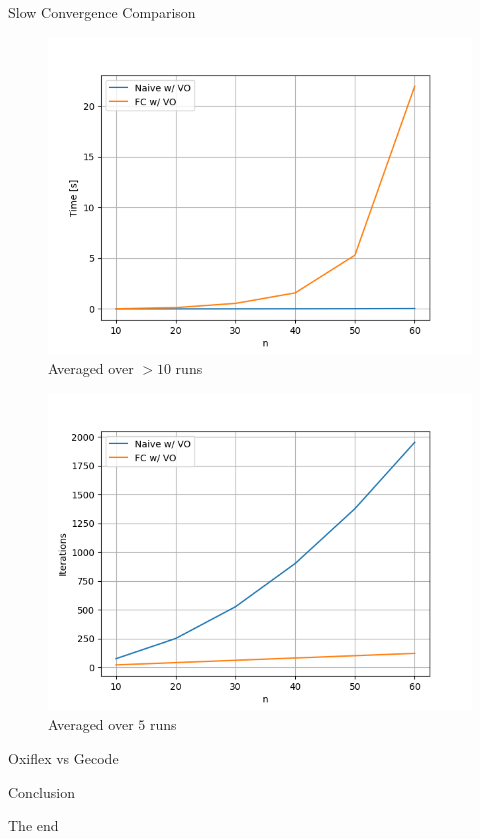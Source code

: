 \documentclass[mathserif,table]{gkibeamer-aaai}
\begin{document}
\begin{frame}{Slow Convergence Comparison}
	\begin{multicols}{2}
		\begin{figure}[ht]
			\includegraphics[scale=0.35]{./figures/plots/slow/time.png}
			\caption{Averaged over $>10$ runs}
		\end{figure}
		\columnbreak
		\begin{figure}[ht]
			\includegraphics[scale=0.35]{./figures/plots/slow/iterations.png}
			\caption{Averaged over $5$ runs}
		\end{figure}
	\end{multicols}
\end{frame}

\begin{frame}{Oxiflex vs Gecode}
\end{frame}

\begin{frame}
	\begin{center}
		\huge{Conclusion}
	\end{center}
\end{frame}

\begin{frame}
	\begin{center}
		\huge{The end}
	\end{center}
\end{frame}
\end{document}
